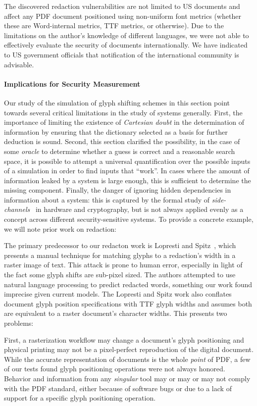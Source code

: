 The discovered redaction vulnerabilities are not limited to US documents and affect any PDF document positioned using non-uniform font metrics (whether these are Word-internal metrics, TTF metrics, or otherwise).
Due to the limitations on the author's knowledge of different languages, we were not able to effectively evaluate the security of documents internationally.
We have indicated to US government officials that notification of the international community is advisable.

\paragraph{Implications for Security Measurement}
Our study of the simulation of glyph shifting schemes in this section point towards several critical limitations in the study of systems generally.
First, the importance of limiting the existence of \emph{Cartesian doubt} in the determination of information by ensuring that the dictionary selected as a basis for further deduction is sound.
Second, this section clarified the possibility, in the case of some \emph{oracle} to determine whether a guess is correct and a reasonable search space, it is possible to attempt a universal quantification over the possible inputs of a simulation in order to find inputs that ``work''.
In cases where the amount of information leaked by a system is large enough, this is sufficient to determine the missing component.
Finally, the danger of ignoring hidden dependencies in information about a system: this is captured by the formal study of \emph{side-channels}~\cite{zhou2005side} in hardware and cryptography, but is not always applied evenly as a concept across different security-sensitive systems.
To provide a concrete example, we will note prior work on redaction:

The primary predecessor to our redacton work is Lopresti and Spitz~\cite{lopresti2004quantifying}, which presents a manual technique for matching glyphs to a redaction's width in a raster image of text.
This attack is prone to human error, especially in light of the fact some glyph shifts are sub-pixel sized.
The authors attempted to use natural language processing to predict redacted words, something our work found imprecise given current models.
The Lopresti and Spitz work also conflates document glyph position specifications with TTF glyph widths and assumes both are equivalent to a raster document's character widths.
This presents two problems:

First, a rasterization workflow may change a document's glyph positioning and physical printing may not be a pixel-perfect reproduction of the digital document.
While the accurate representation of documents is the whole \emph{point} of PDF, a few of our tests found glyph positioning operations were not always honored.
Behavior and information from any \emph{singular} tool may or may or may not comply with the PDF standard, either because of software bugs or due to a lack of support for a specific glyph positioning operation.


